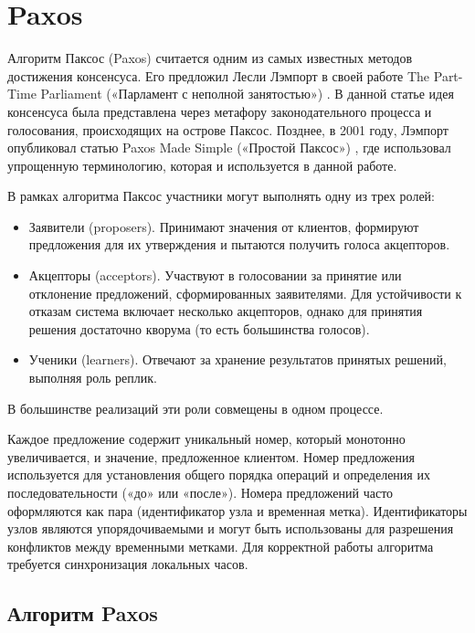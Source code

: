 \section{Paxos}

Алгоритм Паксос (Paxos) считается одним из самых известных методов достижения
консенсуса. Его предложил Лесли Лэмпорт в своей работе The Part-Time
Parliament («Парламент с неполной занятостью») \cite{lamport98}. В данной
статье идея консенсуса была представлена через метафору законодательного
процесса и голосования, происходящих на острове Паксос. Позднее, в 2001 году,
Лэмпорт опубликовал статью Paxos Made Simple («Простой Паксос») \cite{lamport01},
где использовал упрощенную терминологию, которая и используется в данной работе.

В рамках алгоритма Паксос участники могут выполнять одну из трех ролей:

\begin{itemize}
    \item Заявители (proposers). Принимают значения от клиентов, формируют
        предложения для их утверждения и пытаются получить голоса акцепторов.
    \item Акцепторы (acceptors). Участвуют в голосовании за принятие или
        отклонение предложений, сформированных заявителями. Для устойчивости
        к отказам система включает несколько акцепторов, однако для принятия
        решения достаточно кворума (то есть большинства голосов).
    \item Ученики (learners). Отвечают за хранение результатов принятых решений,
        выполняя роль реплик.
\end{itemize}

В большинстве реализаций эти роли совмещены в одном процессе.

Каждое предложение содержит уникальный номер, который монотонно увеличивается,
и значение, предложенное клиентом. Номер предложения используется для установления
общего порядка операций и определения их последовательности («до» или «после»).
Номера предложений часто оформляются как пара (идентификатор узла и временная метка).
Идентификаторы узлов являются упорядочиваемыми и могут быть использованы для
разрешения конфликтов между временными метками. Для корректной работы алгоритма
требуется синхронизация локальных часов.

\subsection{Алгоритм Paxos}


